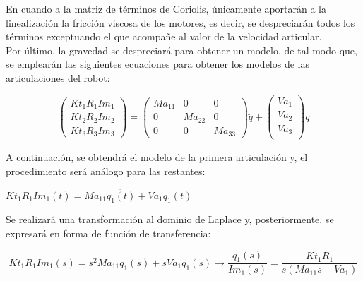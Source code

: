 En cuando a la matriz de términos de Coriolis, únicamente aportarán a la linealización la fricción viscosa de los motores, es decir, se despreciarán todos los términos exceptuando el que acompañe al valor de la velocidad articular.\\

Por último, la gravedad se despreciará para obtener un modelo, de tal modo que, se emplearán las siguientes ecuaciones para obtener los modelos de las articulaciones del robot:

\begin{equation}
\begin{pmatrix}

Kt_{1}R_{1}Im_{1}  \\

Kt_{2}R_{2}Im_{2}  \\

Kt_{3}R_{3}Im_{3}
\end{pmatrix} =
\begin{pmatrix}

Ma_{11} & 0 	  & 0  \\

0   & Ma_{22} & 0  \\

0   & 0   	  & Ma_{33}

\end{pmatrix}
\ddot{q}+
\begin{pmatrix}

Va_{1} \\

Va_{2} \\

Va_{3} \\

\end{pmatrix}
\dot{q}
\end{equation}



A continuación, se obtendrá el modelo de la primera articulación y, el procedimiento será análogo para las restantes:

\begin{center}

	$Kt_{1}R_{1}Im_{1}(t)=Ma_{11}\ddot{q_{1}(t)} + Va_{1}\dot{q_{1}(t)}$

\end{center}

Se realizará una transformación al dominio de Laplace y, posteriormente, se expresará en forma de función de transferencia:

\begin{equation}
Kt_{1}R_{1}Im_{1}(s)=s^{2}Ma_{11}q_{1}(s) + sVa_{1}q_{1}(s) \rightarrow \frac{q_{1}(s)}{Im_{1}(s)}=\frac{Kt_{1}R_{1}}{s(Ma_{11}s+Va_{1})}
\end{equation}



